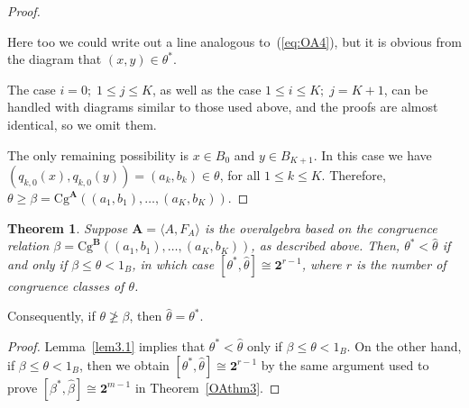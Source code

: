 \documentclass[cm,dissertation,actual,final]{uhthesis}
\theoremstyle{plain}
\newtheorem{theorem}{Theorem}[section]
\theoremstyle{definition}
\theoremstyle{remark}
\numberwithin{theorem}{section}
\numberwithin{claim}{chapter}
\numberwithin{equation}{section}
\numberwithin{conjecture}{chapter}
\newcommand{\<}{\ensuremath{\langle}}
\renewcommand{\>}{\ensuremath{\rangle}}
\renewcommand{\leq}{\ensuremath{\leqslant}}
\renewcommand{\geq}{\ensuremath{\geqslant}}
\renewcommand{\ngeq}{\ensuremath{\ngeqslant}}
\newcommand{\Cg}{\ensuremath{\mathrm{Cg}}}
\newcommand{\0}{\ensuremath{\mathbf{0}}}
\newcommand{\1}{\ensuremath{\mathbf{1}}}
\newcommand{\2}{\ensuremath{\mathbf{2}}}
\newcommand{\3}{\ensuremath{\mathbf{3}}}
\newcommand{\4}{\ensuremath{\mathbf{4}}}
\newcommand{\5}{\ensuremath{\mathbf{5}}}
\newcommand{\bA}{\ensuremath{\mathbf{A}}}
\newcommand{\bB}{\ensuremath{\mathbf{B}}}
\newcommand{\two}{\ensuremath{\mathbf{2}}}
\begin{document}
\begin{proof}
\begin{center}
  \end{center}
  Here too we could write out a line analogous to~(\ref{eq:OA4}), but it is
  obvious from the diagram that $(x,y)\in \theta^*$.

  The case $i=0;\; 1 \leq j \leq K$, as well as the case
  $1 \leq i \leq K;\; j = K+1$,
  can be handled with diagrams similar to
  those used above, and the proofs are almost identical, so we omit them.


  The only remaining possibility is $x\in B_0$ and $y\in B_{K+1}$.  In this case
  we have 
  $(q_{k,0}(x),q_{k,0}(y)) = (a_k, b_k) \in \theta$,
  for all $1\leq k \leq K$.
  Therefore, $\theta \geq \beta = \Cg^{\bA}((a_1, b_1), \dots, (a_K, b_K))$.
\end{proof}

\begin{theorem}
  \label{OAthm4}
  Suppose $\bA = \< A, F_A\>$ is the overalgebra
  based on the congruence relation $\beta = \Cg^{\bB}((a_1, b_1), \dots,
  (a_K,b_K))$, as described above. Then,
  $\theta^* < \widehat{\theta}$ if and only if
  $\beta\leq \theta < 1_B$, in which case $[\theta^*, \widehat{\theta}] \cong \two^{r-1}$, where $r$
  is the number of congruence classes of $\theta$. 
\end{theorem}
Consequently, if $\theta \ngeq \beta$, then $\widehat{\theta} = \theta^*$.
\begin{proof}
  Lemma~\ref{lem3.1} implies that $\theta^* < \widehat{\theta}$ only if
  $\beta\leq \theta < 1_B$. On the other hand,  
  if $\beta\leq \theta < 1_B$, then we obtain
  $[\theta^*, \widehat{\theta}] \cong \two^{r-1}$ 
  by the same argument used to prove
  $[\beta^*, \widehat{\beta}] \cong \two^{m-1}$ in 
  Theorem~\ref{OAthm3}.  %
\end{proof}
\end{document}
